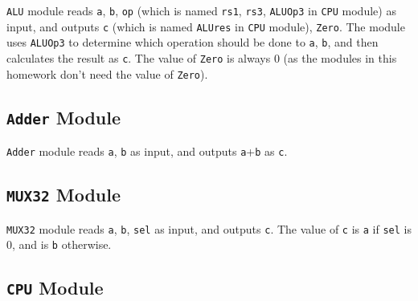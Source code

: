 \texttt{ALU} module reads \texttt{a}, \texttt{b}, \texttt{op} (which is named \texttt{rs1}, \texttt{rs3}, \texttt{ALUOp3} in \texttt{CPU} module) as input, and outputs \texttt{c} (which is named \texttt{ALUres} in \texttt{CPU} module), \texttt{Zero}. The module uses \texttt{ALUOp3} to determine which operation should be done to \texttt{a}, \texttt{b}, and then calculates the result as \texttt{c}. The value of \texttt{Zero} is always $0$ (as the modules in this homework don't need the value of \texttt{Zero}).

\subsection{\texttt{Adder} Module}

\texttt{Adder} module reads \texttt{a}, \texttt{b} as input, and outputs \texttt{a}+\texttt{b} as \texttt{c}.

\subsection{\texttt{MUX32} Module}

\texttt{MUX32} module reads \texttt{a}, \texttt{b}, \texttt{sel} as input, and outputs \texttt{c}. The value of \texttt{c} is \texttt{a} if \texttt{sel} is $0$, and is \texttt{b} otherwise.

\subsection{\texttt{CPU} Module}

